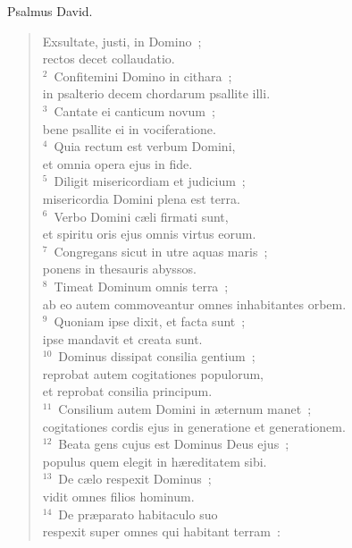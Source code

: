 \lettrine[lines=3,image=true,loversize=0.05,lraise=-0.03]{P}{}salmus David. \begin{flushleft}\begin{verse}\vspace{6pt}Exsultate, justi, in Domino~;\\ rectos decet collaudatio.\\
${}^{2}$~Confitemini Domino in cithara~;\\ in psalterio decem chordarum psallite illi.\\
${}^{3}$~Cantate ei canticum novum~;\\ bene psallite ei in vociferatione.\\
${}^{4}$~Quia rectum est verbum Domini,\\ et omnia opera ejus in fide.\\
${}^{5}$~Diligit misericordiam et judicium~;\\ misericordia Domini plena est terra.\\
${}^{6}$~Verbo Domini c\ae li firmati sunt,\\ et spiritu oris ejus omnis virtus eorum.\\
${}^{7}$~Congregans sicut in utre aquas maris~;\\ ponens in thesauris abyssos.\\
${}^{8}$~Timeat Dominum omnis terra~;\\ ab eo autem commoveantur omnes inhabitantes orbem.\\
${}^{9}$~Quoniam ipse dixit, et facta sunt~;\\ ipse mandavit et creata sunt.\\
${}^{10}$~Dominus dissipat consilia gentium~;\\ reprobat autem cogitationes populorum,\\ et reprobat consilia principum.\\
${}^{11}$~Consilium autem Domini in \ae ternum manet~;\\ cogitationes cordis ejus in generatione et generationem.\\
${}^{12}$~Beata gens cujus est Dominus Deus ejus~;\\ populus quem elegit in h\ae reditatem sibi.\\
${}^{13}$~De c\ae lo respexit Dominus~;\\ vidit omnes filios hominum.\\
${}^{14}$~De pr\ae parato habitaculo suo\\ respexit super omnes qui habitant terram~:\\

\end{verse}
\end{flushleft}
